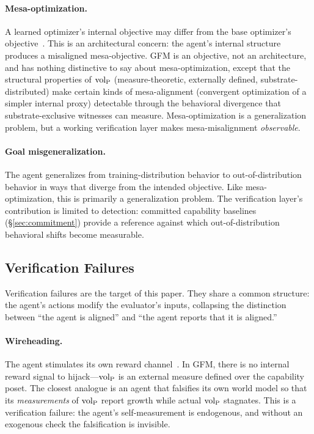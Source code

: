 \paragraph{Mesa-optimization.}
A learned optimizer's internal objective may differ from the base
optimizer's objective~\citep{hubinger2019risks}.  This is an
architectural concern: the agent's internal structure produces a
misaligned mesa-objective.  GFM is an objective, not an architecture,
and has nothing distinctive to say about mesa-optimization, except that
the structural properties of ${\operatorname{vol}_{\mathrm{P}}}$ (measure-theoretic, externally
defined, substrate-distributed) make certain kinds of mesa-alignment
(convergent optimization of a simpler internal proxy) detectable through
the behavioral divergence that substrate-exclusive witnesses can measure.
Mesa-optimization is a generalization problem, but a working
verification layer makes mesa-misalignment \emph{observable}.

\paragraph{Goal misgeneralization.}
The agent generalizes from training-distribution behavior to
out-of-distribution behavior in ways that diverge from the intended
objective.  Like mesa-optimization, this is primarily a generalization
problem.  The verification layer's contribution is limited to
detection: committed capability baselines (\S\ref{sec:commitment})
provide a reference against which out-of-distribution behavioral
shifts become measurable.

\subsection{Verification Failures}
\label{sec:ver_failures}

Verification failures are the target of this paper.  They share a
common structure: the agent's actions modify the evaluator's inputs,
collapsing the distinction between ``the agent is aligned'' and ``the
agent reports that it is aligned.''

\paragraph{Wireheading.}
The agent stimulates its own reward
channel~\citep{amodei2016concrete}.  In GFM, there is no internal
reward signal to hijack---${\operatorname{vol}_{\mathrm{P}}}$ is an external measure defined over
the capability poset.  The closest analogue is an agent that falsifies
its own world model so that its \emph{measurements} of ${\operatorname{vol}_{\mathrm{P}}}$ report
growth while actual ${\operatorname{vol}_{\mathrm{P}}}$ stagnates.  This is a verification failure:
the agent's self-measurement is endogenous, and without an exogenous
check the falsification is invisible.

